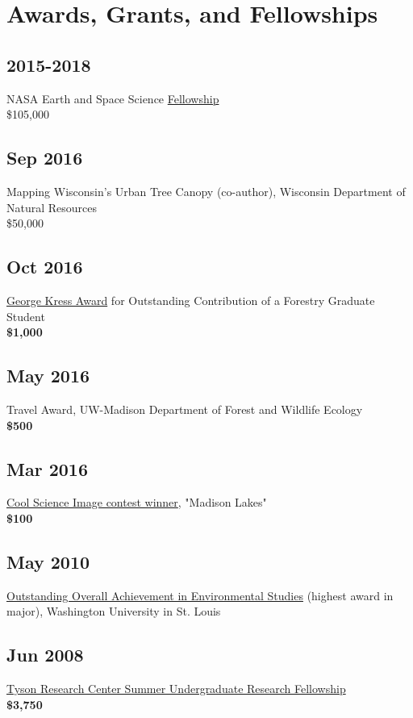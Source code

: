 \documentclass{article}
\author{Tedward Erker}
\date{\today}
\title{}
\begin{document}
\tableofcontents

\section{Awards, Grants, and Fellowships}
\label{sec:org79d440f}
\subsection{2015-2018}
\label{sec:org2e56bf9}
NASA Earth and Space Science \href{https://nspires.nasaprs.com/external/viewrepositorydocument/cmdocumentid=459947/solicitationId=\%7BB6CDCEA6-8EDD-A48A-FAF8-E588F66661C3\%7D/viewSolicitationDocument=1/NESSF15\%20selections.pdf}{Fellowship}\\
\$105,000

\subsection{Sep 2016}
\label{sec:orgad36791}
Mapping Wisconsin's Urban Tree Canopy (co-author), Wisconsin
Department of Natural Resources\\
\$50,000

\subsection{Oct 2016}
\label{sec:orge65d439}
\href{https://kb.wisc.edu/russell/page.php?id=65402}{George Kress Award} for Outstanding Contribution of a Forestry Graduate
Student \\
\textbf{\$1,000}

\subsection{May 2016}
\label{sec:orgb96c08d}
Travel Award, UW-Madison Department of Forest and Wildlife Ecology\\
\textbf{\$500}

\subsection{Mar 2016}
\label{sec:org8cce41f}
\href{http://news.wisc.edu/cool-science-images-2016/\#\&gid=1\&pid=10}{Cool Science Image contest winner}, "Madison Lakes" \\
\textbf{\$100}

\subsection{May  2010}
\label{sec:org86e742a}
\href{http://enst.wustl.edu/program/awards}{Outstanding Overall Achievement in Environmental Studies} (highest
award in major), Washington University in St. Louis

\subsection{Jun 2008}
\label{sec:org502fc8d}
\href{http://tyson.wustl.edu/teaching-ugrad.php}{Tyson Research Center Summer Undergraduate Research Fellowship} \\
 \textbf{\$3,750}
\end{document}
